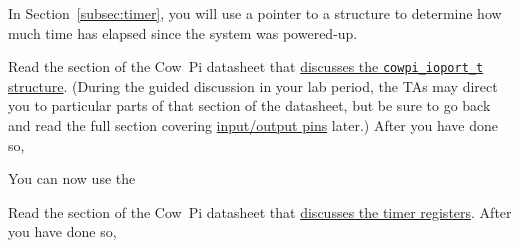 In Section~\ref{subsec:timer}, you will use a pointer to a
structure to determine how much time has elapsed since the system was powered-up.

Read the section of the Cow~Pi datasheet that \href{https://cow-pi.readthedocs.io/en/latest/CowPi_\lowercaseprocessor/io_registers.html#structure-for-memory-mapped-input-output}{discusses the \lstinline{cowpi_ioport_t} structure}.
(During the guided discussion in your lab period, the TAs may direct you to particular parts of that section of the datasheet,
but be sure to go back and read the full section covering \href{https://cow-pi.readthedocs.io/en/latest/CowPi_\lowercaseprocessor/io_registers.html#external-pins-input-output}{input/output pins} later.)
After you have done so,
\begin{description}
\end{description}



You can now use the


Read the section of the Cow~Pi datasheet that \href{https://cow-pi.readthedocs.io/en/latest/CowPi_\lowercaseprocessor/io_registers.html#timers}{discusses the timer registers}.
After you have done so,
\begin{description}
\end{description}

